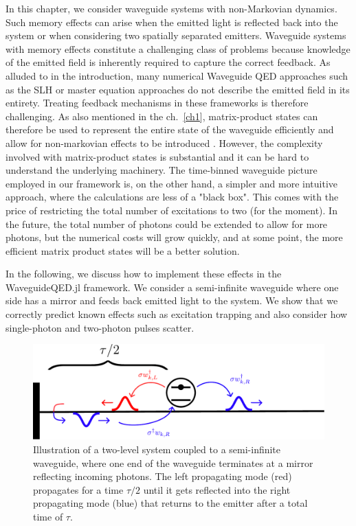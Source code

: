 In this chapter, we consider waveguide systems with non-Markovian dynamics. Such memory effects can arise when the emitted light is reflected back into the system or when considering two spatially separated emitters. Waveguide systems with memory effects constitute a challenging class of problems because knowledge of the emitted field is inherently required to capture the correct feedback. As alluded to in the introduction, many numerical Waveguide QED approaches such as the SLH \cite{Kiilerich2019Input-OutputPulses,Kiilerich2020QuantumRadiation} or master equation approaches \cite{Baragiola2012N-PhotonSystem} do not describe the emitted field in its entirety. Treating feedback mechanisms in these frameworks is therefore challenging. As also mentioned in the ch.~\ref{ch1}, matrix-product states can therefore be used to represent the entire state of the waveguide efficiently and allow for non-markovian effects to be introduced \cite{ArranzRegidor2021ModelingModel}. However, the complexity involved with matrix-product states is substantial and it can be hard to understand the underlying machinery. The time-binned waveguide picture employed in our framework is, on the other hand, a simpler and more intuitive approach, where the calculations are less of a "black box". This comes with the price of restricting the total number of excitations to two (for the moment). In the future, the total number of photons could be extended to allow for more photons, but the numerical costs will grow quickly, and at some point, the more efficient matrix product states will be a better solution. 

In the following, we discuss how to implement these effects in the WaveguideQED.jl framework. We consider a semi-infinite waveguide where one side has a mirror and feeds back emitted light to the system. We show that we correctly predict known effects such as excitation trapping and also consider how single-photon and two-photon pulses scatter.  



\begin{figure}[H]
    \centering
    \includegraphics[width = 1 \linewidth]{figures/mirror_feedback.pdf}
    \caption{Illustration of a two-level system coupled to a semi-infinite waveguide, where one end of the waveguide terminates at a mirror reflecting incoming photons. The left propagating mode (red) propagates for a time $\tau/2$ until it gets reflected into the right propagating mode (blue) that returns to the emitter after a total time of $\tau$.}
    \label{fig:feedback_sketch}
\end{figure}

